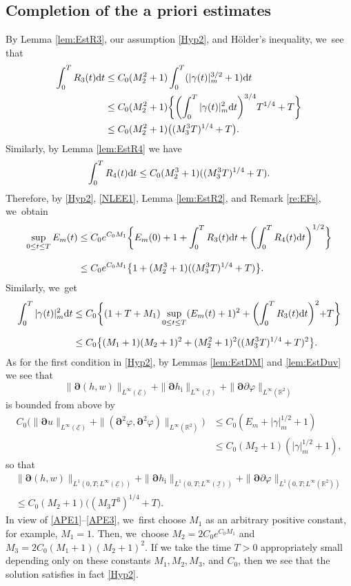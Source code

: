 \documentclass[10pt]{amsart}
\newcommand{\R}{{\mathbb R}}
\newcommand{\cI}{{\mathcal I}}
\newcommand{\cE}{{\mathcal E}}
\newcommand{\ul}[1]{\underline{#1}}
\theoremstyle{definition}
\begin{document}
\subsection{Completion of the a priori estimates}\label{sectAPE}
By Lemma \ref{lem:EstR3}, our assumption \eqref{Hyp2}, and Hölder's inequality, we~see that
\begin{align*}
\int_0^TR_3(t){\rm d}t
&\leq C_0(M_2^2+1)\int_0^T(|\gamma(t)|_m^{3/2}+1){\rm d}t \\
&\leq C_0(M_2^2+1)\biggl\{ \biggl(\int_0^T|\gamma(t)|_m^2{\rm d}t\biggr)^{3/4}T^{1/4} + T \biggl\} \\
&\leq C_0(M_2^2+1)\bigl((M_3^3T)^{1/4}+T\bigr).
\end{align*}
Similarly, by Lemma \ref{lem:EstR4} we have
\[
\int_0^TR_4(t){\rm d}t \leq C_0(M_2^3+1)((M_3^3T)^{1/4}+T).
\]
Therefore, by \eqref{Hyp2}, \eqref{NLEE1}, Lemma \ref{lem:EstR2}, and Remark \ref{re:EFs}, we~obtain
\begin{align}\label{APE1}
\sup_{0\leq t\leq T}E_m(t)
&\leq C_0 e^{C_0M_1}\biggl\{ E_m(0) + 1 + \int_0^TR_3(t){\rm d}t + \biggl(\int_0^TR_4(t){\rm d}t \biggr)^{1/2} \biggr\} \notag\\[-3pt] &\\[-5pt]
&\leq C_0 e^{C_0M_1}\bigl\{ 1 + (M_2^3+1)((M_3^3T)^{1/4}+T) \bigr\}.\notag
\end{align}
Similarly, we~get
\begin{align}\label{APE2}
\int_0^T|\gamma(t)|_m^2{\rm d}t
&\leq C_0 \biggl\{ (1+T+M_1)\sup_{0\leq t\leq T}(E_m(t)+1)^2 + \biggl(\int_0^TR_3(t){\rm d}t \biggl)^2 + T \biggr\}\notag \\ &\\[-10pt]
&\leq C_0 \bigl\{ (M_1+1)(M_2+1)^2 + (M_2^2+1)^2 ((M_3^3T)^{1/4}+T)^2 \bigr\}.\notag
\end{align}
As for the first condition in \eqref{Hyp2}, by Lemmas \ref{lem:EstDM} and \ref{lem:EstDuv} we see that
\[
\|\bm{\partial}(h,w)\|_{L^\infty(\ul{\cE})} + \|\bm{\partial} h_\mathrm{i}\|_{L^\infty(\ul{\cI})} + \|\bm{\partial}\partial\varphi\|_{L^\infty(\R^2)}
\]
is bounded from above by
\begin{align*}
C_0 \bigl(\|\bm{\partial}u\|_{L^\infty(\ul{\cE})} + \|(\bm{\partial}^2\varphi,\bm{\partial}^2\varphi)\|_{L^\infty(\R^2)} \bigr)
&\leq C_0 (E_m + |\gamma|_m^{1/2} + 1) \\
&\leq C_0(M_2+1)(|\gamma|_m^{1/2}+1),
\end{align*}
so that
\begin{multline}\label{APE3}
\|\bm{\partial}(h,w)\|_{L^1(0,T;L^\infty(\ul{\cE}))} + \|\bm{\partial} h_\mathrm{i}\|_{L^1(0,T;L^\infty(\ul{\cI}))}
+ \|\bm{\partial}\partial\varphi\|_{L^1(0,T;L^\infty(\R^2))} \\
\leq C_0(M_2+1)\bigl((M_3T^3)^{1/4}+T\bigr).
\end{multline}
In view of \eqref{APE1}--\eqref{APE3}, we~first choose $M_1$ as an arbitrary positive constant, for example, $M_1=1$.
Then, we~choose $M_2=2C_0e^{C_0M_1}$ and $M_3=2C_0(M_1+1)(M_2+1)^2$.
If we take the time $T>0$ appropriately small depending only on these constants $M_1,M_2,M_3$, and $C_0$,
then we see that the solution satisfies in fact \eqref{Hyp2}.
\end{document}

